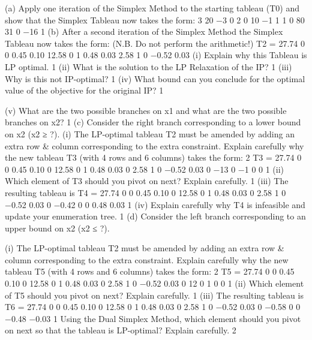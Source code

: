 \begin{frame}
\begin{frame}
(a) Apply one iteration of the Simplex Method to the starting tableau (T0)
and show that the Simplex Tableau now takes the form: 3%
20 −3 0 2 0
10 −1 1 1 0
80 31 0 −16 1
(b) After a second iteration of the Simplex Method the Simplex Tableau
now takes the form: (N.B. Do not perform the arithmetic!)
T2 =
27.74 0 0 0.45 0.10
12.58 0 1 0.48 0.03
2.58 1 0 −0.52 0.03
(i) Explain why this Tableau is LP optimal. 1%
(ii) What is the solution to the LP Relaxation of the IP? 1%
(iii) Why is this not IP-optimal? 1%
(iv) What bound can you conclude for the optimal value of the objective
for the original IP? 1%

(v) What are the two possible branches on x1 and what are the two
possible branches on x2? 1%
(c) Consider the right branch corresponding to a lower bound on x2 (x2 ≥
?).
(i) The LP-optimal tableau T2 must be amended by adding an extra
row & column corresponding to the extra constraint. Explain
carefully why the new tableau T3 (with 4 rows and 6 columns)
takes the form: 2%
T3 =
27.74 0 0 0.45 0.10 0
12.58 0 1 0.48 0.03 0
2.58 1 0 −0.52 0.03 0
−13 0 −1 0 0 1
(ii) Which element of T3 should you pivot on next? Explain carefully. 1%
(iii) The resulting tableau is
T4 =
27.74 0 0 0.45 0.10 0
12.58 0 1 0.48 0.03 0
2.58 1 0 −0.52 0.03 0
−0.42 0 0 0.48 0.03 1
(iv) Explain carefully why T4 is infeasible and update your enumeration
tree. 1%
(d) Consider the left branch corresponding to an upper bound on x2 (x2 ≤
?).


(i) The LP-optimal tableau T2 must be amended by adding an extra
row & column corresponding to the extra constraint. Explain
carefully why the new tableau T5 (with 4 rows and 6 columns)
takes the form: 2%
T5 =
27.74 0 0 0.45 0.10 0
12.58 0 1 0.48 0.03 0
2.58 1 0 −0.52 0.03 0
12 0 1 0 0 1
(ii) Which element of T5 should you pivot on next? Explain carefully. 1%
(iii) The resulting tableau is
T6 =
27.74 0 0 0.45 0.10 0
12.58 0 1 0.48 0.03 0
2.58 1 0 −0.52 0.03 0
−0.58 0 0 −0.48 −0.03 1
Using the Dual Simplex Method, which element should you pivot
on next so that the tableau is LP-optimal? Explain carefully. 2%


\end{frame}
\end{frame}
